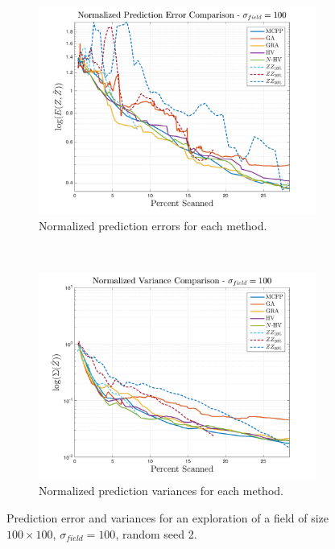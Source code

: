 \begin{figure}[htb!]
    \centering
    \begin{subfigure}[t]{0.75\textwidth}
        \centering
        \includegraphics[width=\linewidth]{figures/results/normalized_errors_30p_100x100_sf_100_seed_2_app_50.png}
        \captionsetup{skip=0.20\baselineskip,size=footnotesize}
        \caption{Normalized prediction errors for each method.}
    \end{subfigure}%
    \\
    \begin{subfigure}[t]{0.75\textwidth}
        \centering
        \includegraphics[width=\linewidth]{figures/results/normalized_variances_30p_100x100_sf_100_seed_2_app_50.png}
        \captionsetup{skip=0.20\baselineskip,size=footnotesize}
        \caption{Normalized prediction variances for each method.}
    \end{subfigure}%
    \captionsetup{skip=0.20\baselineskip}
    \caption{Prediction error and variances for an exploration of a field of size $100 \times 100$, $\sigma_{field} = 100$, random seed 2.}
    \label{fig:errvar100}
\end{figure}

